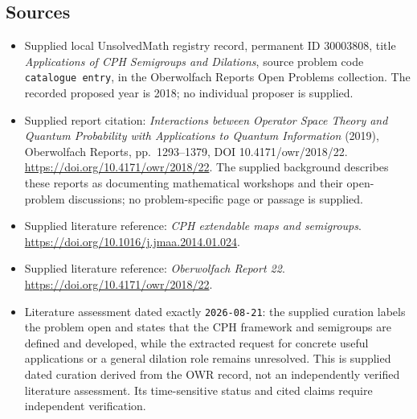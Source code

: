 \documentclass[11pt]{article}
\begin{document}
\subsection{Sources}
\begin{itemize}
\item Supplied local UnsolvedMath registry record, permanent ID \(30003808\), title \emph{Applications of CPH Semigroups and Dilations}, source problem code \texttt{catalogue entry}, in the Oberwolfach Reports Open Problems collection. The recorded proposed year is 2018; no individual proposer is supplied.
\item Supplied report citation: \emph{Interactions between Operator Space Theory and Quantum Probability with Applications to Quantum Information} (2019), Oberwolfach Reports, pp.\ 1293--1379, DOI 10.4171/owr/2018/22. \url{https://doi.org/10.4171/owr/2018/22}. The supplied background describes these reports as documenting mathematical workshops and their open-problem discussions; no problem-specific page or passage is supplied.
\item Supplied literature reference: \emph{CPH extendable maps and semigroups}. \url{https://doi.org/10.1016/j.jmaa.2014.01.024}.
\item Supplied literature reference: \emph{Oberwolfach Report 22}. \url{https://doi.org/10.4171/owr/2018/22}.
\item Literature assessment dated exactly \texttt{2026-08-21}: the supplied curation labels the problem open and states that the CPH framework and semigroups are defined and developed, while the extracted request for concrete useful applications or a general dilation role remains unresolved. This is supplied dated curation derived from the OWR record, not an independently verified literature assessment. Its time-sensitive status and cited claims require independent verification.
\end{itemize}
\end{document}
